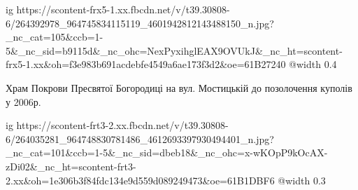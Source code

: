  
 
 
 
 

\ifcmt
  ig https://scontent-frx5-1.xx.fbcdn.net/v/t39.30808-6/264392978_964745834115119_4601942812143488150_n.jpg?_nc_cat=105&ccb=1-5&_nc_sid=b9115d&_nc_ohc=NexPyxihglEAX9OVUkJ&_nc_ht=scontent-frx5-1.xx&oh=f3e983b691acdebfe4549a6ae173f3d2&oe=61B27240
  @width 0.4
\fi

Храм Покрови Пресвятої Богородиці на вул. Мостицькій до позолочення куполів у 2006р.


\ifcmt
  ig https://scontent-frt3-2.xx.fbcdn.net/v/t39.30808-6/264035281_964748830781486_4612693397930494401_n.jpg?_nc_cat=101&ccb=1-5&_nc_sid=dbeb18&_nc_ohc=x-wKOpP9kOcAX-zDi02&_nc_ht=scontent-frt3-2.xx&oh=1e306b3f84fdc134e9d559d089249473&oe=61B1DBF6
  @width 0.3
\fi
